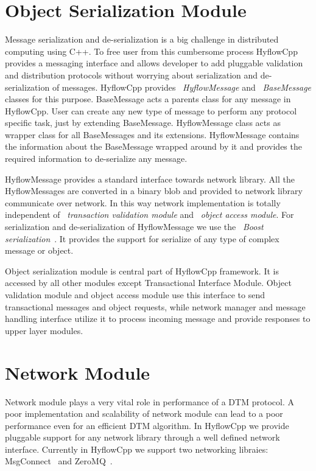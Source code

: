 \documentclass[12pt,english]{report}
\begin{document}
\section{Object Serialization Module}

Message serialization and de-serialization is a big challenge in distributed computing using C++. To free user from this cumbersome process HyflowCpp provides a messaging interface and allows developer to add pluggable validation and distribution protocols without worrying about serialization and de-serialization of messages. HyflowCpp provides ~\emph{HyflowMessage} and ~\emph{BaseMessage} classes for this purpose. BaseMessage acts a parents class for any message in HyflowCpp. User can create any new type of message to perform any protocol specific task, just by extending BaseMessage. HyflowMessage class acts as wrapper class for all BaseMessages and its extensions. HyflowMessage contains the information about the BaseMessage wrapped around by it and provides the required information to de-serialize any message.

HyflowMessage provides a standard interface towards network library. All the HyflowMessages are converted in a binary blob and provided to network library communicate over network. In this way network implementation is totally independent of ~\emph{transaction validation module} and ~\emph{object access module}. For serialization and de-serialization of HyflowMessage we use the ~\emph{Boost serialization}~\cite{karlsson2005beyond}. It provides the support for serialize of any type of complex message or object.  

Object serialization module is central part of HyflowCpp framework. It is accessed by all other modules except Transactional Interface Module. Object validation module and object access module use this interface to send transactional messages and object requests, while network manager and message handling interface utilize it to process incoming message and provide responses to upper layer modules.

\section{Network Module}

Network module plays a very vital role in performance of a DTM protocol. A poor implementation and scalability of network module can lead to a poor performance even for an efficient DTM algorithm. In HyflowCpp we provide pluggable support for any network library through a well defined network interface. Currently in HyflowCpp we support two networking libraies: MsgConnect~\cite{MsgConnect:2012} and ZeroMQ~\cite{hintjens2011omq}.  
\end{document}

